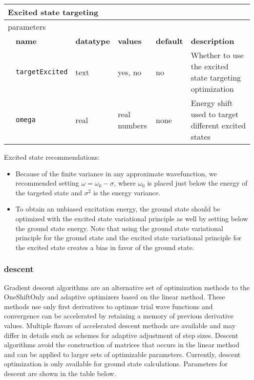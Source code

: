 \begin{table}[h]
\begin{center}
\begin{tabularx}{\textwidth}{l l l l l X }
\hline
\multicolumn{6}{l}{Excited state targeting} \\
\hline
\multicolumn{2}{l}{parameters}  & \multicolumn{4}{l}{}\\
   &   \bfseries name     & \bfseries datatype & \bfseries values & \bfseries default   & \bfseries description \\
   &   \texttt{targetExcited} &  text   & yes, no      & no   & Whether to use the excited state targeting optimization\\
   &   \texttt{omega}         &  real   & real numbers & none & Energy shift used to target different excited states\\
  \hline
\end{tabularx}
\end{center}
\end{table}

Excited state recommendations:
\begin{itemize}
  \item Because of the finite variance in any approximate wavefunction, we recommended setting $\omega=\omega_0-\sigma$, where $\omega_0$ is placed just
        below the energy of the targeted state and $\sigma^2$ is the energy variance.
  \item To obtain an unbiased excitation energy, the ground state should be optimized with the excited state variational principle as well by setting
         below the ground state energy.  Note that using the ground state variational principle for the ground state and the excited state variational
        principle for the excited state creates a bias in favor of the ground state. 
\end{itemize}

\subsubsection{descent}
Gradient descent algorithms are an alternative set of optimization methods to the OneShiftOnly and adaptive optimizers based on the linear method.
These methods use only first derivatives to optimze trial wave functions and convergence can be accelerated by retaining a memory of previous derivative values.
Multiple flavors of accelerated descent methods are available and may differ in details such as schemes for adaptive adjustment of step sizes.\cite{Otis2019}
Descent algorithms avoid the construction of matrices that occurs in the linear method and can be applied to larger sets of optimizable parameters.
Currently, descent optimization is only available for ground state calculations.
Parameters for descent are shown in the table below.\\

